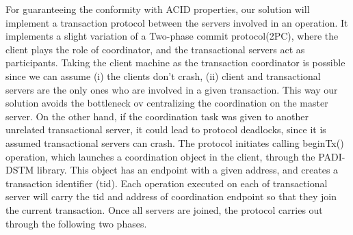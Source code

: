 \documentclass[times, 10pt,twocolumn]{article}
\begin{document}
For guaranteeing the conformity with ACID properties, our solution will implement a transaction protocol between the servers involved in an operation. It implements a slight variation of a Two-phase commit protocol(2PC), where the client plays the role of coordinator, and the transactional servers act as participants. Taking the client machine as the transaction coordinator is possible since we can assume (i) the clients don't crash, (ii) client and transactional servers are the only ones who are involved in a given transaction. This way our solution avoids the bottleneck ov centralizing the coordination on the master server. On the other hand, if the coordination task was given to another unrelated transactional server, it could lead to protocol deadlocks, since it is assumed transactional servers can crash.
The protocol initiates calling beginTx() operation, which launches a coordination object in the client, through the PADI-DSTM library. This object has an endpoint with a given address, and creates a transaction identifier (tid). Each operation executed on each of transactional server will carry the tid and address of coordination endpoint so that they join the current transaction. Once all servers are joined, the protocol carries out through the following two phases.
\end{document}
